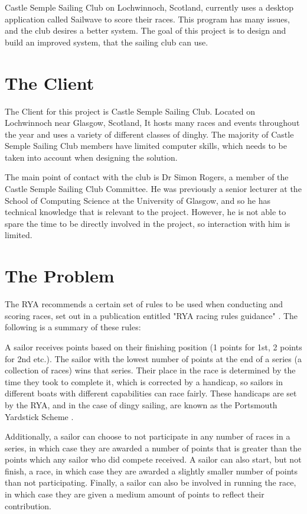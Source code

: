 \documentclass{l4proj}
\begin{document}
Castle Semple Sailing Club on Lochwinnoch, Scotland, currently uses a desktop application called Sailwave to score their races. This program has many issues, and the club desires a better system. The goal of this project is to design and build an improved system, that the sailing club can use.

\section{The Client}
The Client for this project is Castle Semple Sailing Club. Located on Lochwinnoch near Glasgow, Scotland, It hosts many races and events throughout the year and uses a variety of different classes of dinghy. The majority of Castle Semple Sailing Club members have limited computer skills, which needs to be taken into account when designing the solution.

The main point of contact with the club is Dr Simon Rogers, a member of the Castle Semple Sailing Club Committee. He was previously a senior lecturer at the School of Computing Science at the University of Glasgow, and so he has technical knowledge that is relevant to the project. However, he is not able to spare the time to be directly involved in the project, so interaction with him is limited. 

\section{The Problem}
The RYA recommends a certain set of rules to be used when conducting and scoring races, set out in a publication entitled "RYA racing rules guidance" \citep{RYAscore}. The following is a summary of these rules:

A sailor receives points based on their finishing position (1 points for 1st, 2 points for 2nd etc.). The sailor with the lowest number of points at the end of a series (a collection of races) wins that series. Their place in the race is determined by the time they took to complete it, which is corrected by a handicap, so sailors in different boats with different capabilities can race fairly. These handicaps are set by the RYA, and in the case of dingy sailing, are known as the Portsmouth Yardstick Scheme \citep{RYApy}.

Additionally, a sailor can choose to not participate in any number of races in a series, in which case they are awarded a number of points that is greater than the points which any sailor who did compete received. A sailor can also start, but not finish, a race, in which case they are awarded a slightly smaller number of points than not participating. Finally, a sailor can also be involved in running the race, in which case they are given a medium amount of points to reflect their contribution.
\end{document}
